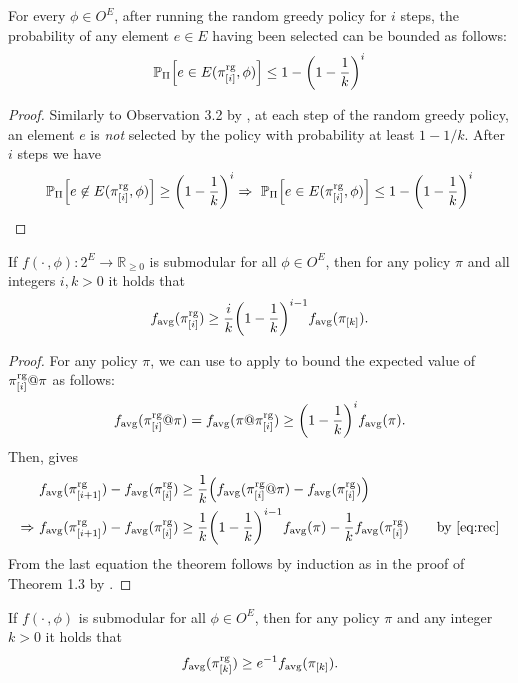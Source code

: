 \begin{lemma}\label{lem:sel}
  For every $\phi \in O^E$, after running the random greedy policy for $i$ steps, the probability of any element $e \in E$ having been selected can be bounded  as follows:
\begin{align*}
  \P[\Pi]{e \in E(\pigi, \phi)} \leq 1 - \left(1 - \frac{1}{k}\right)^i
\end{align*}
\end{lemma}
\begin{proof}
  Similarly to Observation 3.2 by \citet{buchbinder14}, at each step of the random greedy policy, an element $e$ is \emph{not} selected by the policy with probability at least $1 - 1/k$. After $i$ steps we have
  \begin{align*}
    \P[\Pi]{e \not\in E(\pigi, \phi)} \geq \left(1 - \frac{1}{k}\right)^i \Rightarrow\ \P[\Pi]{e \in E(\pigi, \phi)} \leq 1 - \left(1 - \frac{1}{k}\right)^i
  \end{align*}
\end{proof}

\begin{theorem}\label{thm:nonm}
  If $f(\cdot\,, \phi) : 2^E \to \mathbb{R}_{\geq 0}$ is submodular for all $\phi \in O^E$, then for any policy $\pi$ and all integers $i, k > 0$ it holds that
  \begin{align*}
    \favg(\pigi) \geq \frac{i}{k}\left(1 - \frac{1}{k}\right)^{i-1}\favg(\pik).
  \end{align*}
\end{theorem}
\begin{proof}
  For any policy $\pi$, we can use  to apply  to bound the expected value of $\pi^{\textrm{rg}}_{[i]} @ \pi$ as follows:
  \begin{align}\label{eq:rec}
    \favg(\pigi @ \pi) = \favg(\pi @ \pigi) \geq \left(1 - \frac{1}{k}\right)^i \favg(\pi).
  \end{align}
  Then,  gives
  \begin{align*}
    &\favg(\pigii) - \favg(\pigi) \geq \frac{1}{k}\left(\favg(\pigi @ \pi) - \favg(\pigi)\right)\\
    \Rightarrow\ &\favg(\pigii) - \favg(\pigi) \geq \frac{1}{k}\left(1 - \frac{1}{k}\right)^{i-1}\favg(\pi) - \frac{1}{k}\favg(\pigi) \tag*{by \eqref{eq:rec}}
  \end{align*}
  From the last equation the theorem follows by induction as in the proof of Theorem 1.3 by \citet{buchbinder14}.
\end{proof}

\begin{cor}
  If $f(\cdot\,, \phi)$ is submodular for all $\phi \in O^E$, then for any policy $\pi$ and any integer $k > 0$ it holds that
  \begin{align*}
    f_{\mathrm{avg}}(\pi^{\textrm{rg}}_{[k]}) \geq e^{-1}f_{\mathrm{avg}}(\pi_{[k]}).
  \end{align*}
\end{cor}
